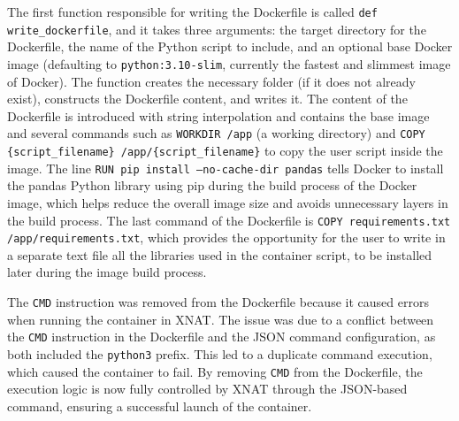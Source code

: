 The first function responsible for writing the Dockerfile is called \texttt{def write\_dockerfile}, and it takes three arguments: the target directory for the Dockerfile, the name of the Python script to include, and an optional base Docker image (defaulting to \texttt{python:3.10-slim}, currently the fastest and slimmest image of Docker). The function creates the necessary folder (if it does not already exist), constructs the Dockerfile content, and writes it. The content of the Dockerfile is introduced with string interpolation and contains the base image and several commands such as \texttt{WORKDIR /app} (a working directory) and \texttt{COPY \{script\_filename\} /app/\{script\_filename\}} to copy the user script inside the image. The line \texttt{RUN pip install --no-cache-dir pandas} tells Docker to install the pandas Python library using pip during the build process of the Docker image, which helps reduce the overall image size and avoids unnecessary layers in the build process. The last command of the Dockerfile is \texttt{COPY requirements.txt /app/requirements.txt}, which provides the opportunity for the user to write in a separate text file all the libraries used in the container script, to be installed later during the image build process.


The \texttt{CMD} instruction was removed from the Dockerfile because it caused errors when running the container in XNAT. The issue was due to a conflict between the \texttt{CMD} instruction in the Dockerfile and the JSON command configuration, as both included the \texttt{python3} prefix. This led to a duplicate command execution, which caused the container to fail. By removing \texttt{CMD} from the Dockerfile, the execution logic is now fully controlled by XNAT through the JSON-based command, ensuring a successful launch of the container.



\lstset{style=allblack}



\lstset{inputpath=en/content}



